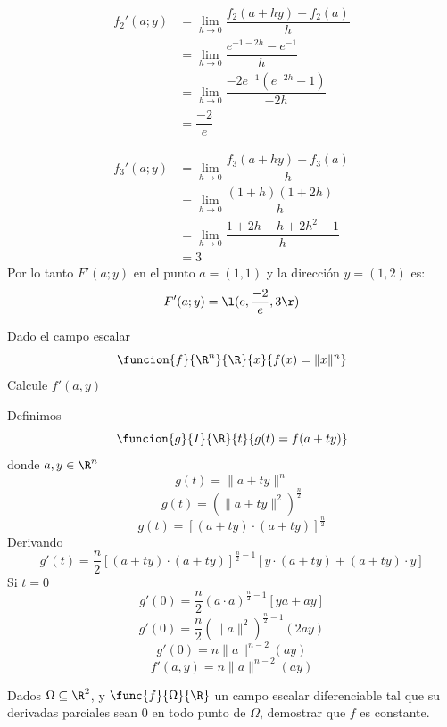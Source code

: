 \documentclass[a4,11pt]{aleph-examen}
\begin{document}
\begin{preguntas}
\begin{respuesta}
\begin{respuesta}
\begin{respuesta}
	\[
    \begin{aligned}
       f_2'(a;y) & = \lim_{h\to 0} \dfrac{f_2(a+hy)-f_2(a)}{h}\\
        & =  \lim_{h\to 0} \dfrac{e^{-1-2h}-e^{-1}}{h}\\
        & =  \lim_{h\to 0} \dfrac{-2e^{-1}(e^{-2h}-1)}{-2h}\\
        & =  \dfrac{-2}{e}
     \end{aligned}
    \]
    
	\[
    \begin{aligned}
       f_3'(a;y) & = \lim_{h\to 0} \dfrac{f_3(a+hy)-f_3(a)}{h}\\
        & =  \lim_{h\to 0} \dfrac{(1+h)(1+2h)}{h}\\
        & =  \lim_{h\to 0} \dfrac{1+2h+h+2h^2-1}{h}\\
        & =  3
     \end{aligned}
    \]
Por lo tanto $F'(a;y)$ en el punto $a=(1,1)$ y la dirección $y=(1,2)$ es:
    \[
       F'(a;y)=\l(e,\dfrac{-2}{e},3\r)
    \]
\end{respuesta}

\item
    Dado el campo escalar
    \[
        \funcion{f}{\R^n}{\R}{x}{f{(x)=\| x \|^n}}
    \]
    Calcule $f'(a,y)$
    \begin{respuesta}
    Definimos
    \[
        \funcion{g}{I}{\R}{t}{g{(t)=f(a+ty)}}
    \]
    donde $a,y\in \R^n$        
    \[
        g(t)=\| a+ty \|^n
    \]  
    \[
        g(t)=(\| a+ty \|^2)^{\frac{n}{2}}
    \]
    \[
        g(t)=[(a+ty)\cdot (a+ty)]^{\frac{n}{2}}
    \]
    Derivando     
    \[
        g'(t)=\frac{n}{2}[(a+ty)\cdot (a+ty)]^{\frac{n}{2}-1}[y\cdot(a+ty)+(a+ty)\cdot y]
    \]
    Si $t=0$
    \[
        g'(0)=\frac{n}{2}(a\cdot a)^{\frac{n}{2}-1}[ya+ay]
    \]
    \[
        g'(0)=\frac{n}{2}(\| a \|^2)^{\frac{n}{2}-1}(2ay)
    \]
    \[
        g'(0)=n\|a\|^{n-2}(ay)
    \] 
    \[
        f'(a,y)=n\|a\|^{n-2}(ay)
    \] 
\end{respuesta}

\item 
    Dados $\Omega\subseteq \R^2$, y $\func{f}{\Omega}{\R}$ un campo escalar diferenciable tal que su derivadas parciales sean 0 en todo punto de $\Omega$, demostrar que $f$ es constante.


\end{respuesta}
\end{respuesta}
\end{preguntas}
\end{document}
